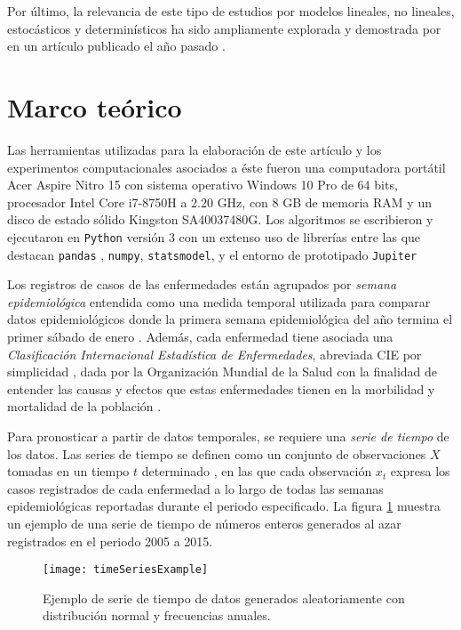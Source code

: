 \documentclass[final,5p,times,twocolumn]{elsarticle}
\begin{document}
Por último, la relevancia de este tipo de estudios por modelos lineales, no lineales, estocásticos y determinísticos ha sido ampliamente explorada y demostrada por \citeauthor{dattnerEA2019} en un artículo publicado el año pasado \cite{dattnerEA2019}.

\section{Marco teórico}
\label{sec:background}

Las herramientas utilizadas para la elaboración de este artículo y los experimentos computacionales asociados a éste fueron una computadora portátil Acer Aspire Nitro 15 con sistema operativo Windows 10 Pro de \(64\) bits, procesador Intel Core i7-8750H a \(2.20\) GHz, con \(8\) GB de memoria RAM y un disco de estado sólido Kingston SA40037480G. Los algoritmos se escribieron y ejecutaron en \texttt{Python} versión 3 \cite{python} con un extenso uso de librerías entre las que destacan \texttt{pandas} \cite{pandas}, \texttt{numpy}, \texttt{statsmodel}, \cite{linregress} y el entorno de prototipado \texttt{Jupiter} \cite{jupyter}

Los registros de casos de las enfermedades están agrupados por \textit{semana epidemiológica} entendida como una medida temporal utilizada para comparar datos epidemiológicos donde la primera semana epidemiológica del año termina el primer sábado de enero \cite{arias2006}. Además, cada enfermedad tiene asociada una \textit{Clasificación Internacional Estadística de Enfermedades}, abreviada CIE por simplicidad \cite{cieManual}, dada por la Organización Mundial de la Salud con la finalidad de entender las causas y efectos que estas enfermedades tienen en la morbilidad y mortalidad de la población \cite{cieSpa}.

Para pronosticar a partir de datos temporales, se requiere una \textit{serie de tiempo} de los datos. Las series de tiempo se definen como un conjunto de observaciones $X$ tomadas en un tiempo $t$ determinado \cite{brockwell2016}, en las que cada observación $x_{t}$ expresa los casos registrados de cada enfermedad a lo largo de todas las semanas epidemiológicas reportadas durante el periodo especificado. La figura \ref{timeSeriesExample} muestra un ejemplo de una serie de tiempo de números enteros generados al azar registrados en el periodo 2005 a 2015.

\begin{figure} %
  \texttt{[image: timeSeriesExample]}
  \caption{Ejemplo de serie de tiempo de datos generados aleatoriamente con distribución normal y frecuencias anuales.}
  \label{timeSeriesExample}
\end{figure}
\end{document}
